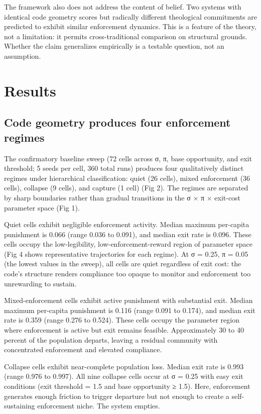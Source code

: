 \documentclass[12pt]{article}
\begin{document}
The framework also does not address the content of belief. Two systems with identical code geometry scores but radically different theological commitments are predicted to exhibit similar enforcement dynamics. This is a feature of the theory, not a limitation: it permits cross-traditional comparison on structural grounds. Whether the claim generalizes empirically is a testable question, not an assumption.

%
\section{Results}

%
\subsection{Code geometry produces four enforcement regimes}

The confirmatory baseline sweep (72 cells across σ, π, base opportunity, and exit threshold; 5 seeds per cell, 360 total runs) produces four qualitatively distinct regimes under hierarchical classification: quiet (26 cells), mixed enforcement (36 cells), collapse (9 cells), and capture (1 cell) (Fig 2). The regimes are separated by sharp boundaries rather than gradual transitions in the σ × π × exit-cost parameter space (Fig 1).

Quiet cells exhibit negligible enforcement activity. Median maximum per-capita punishment is 0.066 (range 0.036 to 0.091), and median exit rate is 0.096. These cells occupy the low-legibility, low-enforcement-reward region of parameter space (Fig 4 shows representative trajectories for each regime). At σ = 0.25, π = 0.05 (the lowest values in the sweep), all cells are quiet regardless of exit cost: the code's structure renders compliance too opaque to monitor and enforcement too unrewarding to sustain.

Mixed-enforcement cells exhibit active punishment with substantial exit. Median maximum per-capita punishment is 0.116 (range 0.091 to 0.174), and median exit rate is 0.359 (range 0.276 to 0.524). These cells occupy the parameter region where enforcement is active but exit remains feasible. Approximately 30 to 40 percent of the population departs, leaving a residual community with concentrated enforcement and elevated compliance.

Collapse cells exhibit near-complete population loss. Median exit rate is 0.993 (range 0.976 to 0.997). All nine collapse cells occur at σ = 0.25 with easy exit conditions (exit threshold = 1.5 and base opportunity ≥ 1.5). Here, enforcement generates enough friction to trigger departure but not enough to create a self-sustaining enforcement niche. The system empties.
\end{document}
